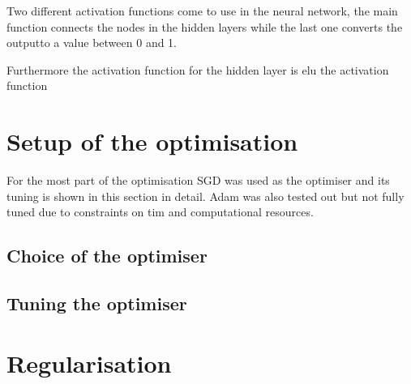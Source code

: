 Two different activation functions come to use in the neural network, the main function connects the nodes in the hidden layers while the last one converts the outputto a value between \num{0} and \num{1}. 


Furthermore the activation function for the hidden layer is elu
the activation function 

\section{Setup of the optimisation}

For the most part of the optimisation SGD was used as the optimiser and its tuning is shown in this section in detail.
Adam was also tested out but not fully tuned due to constraints on tim and computational resources.

\subsection{Choice of the optimiser}

\subsection{Tuning the optimiser}



\section{Regularisation}